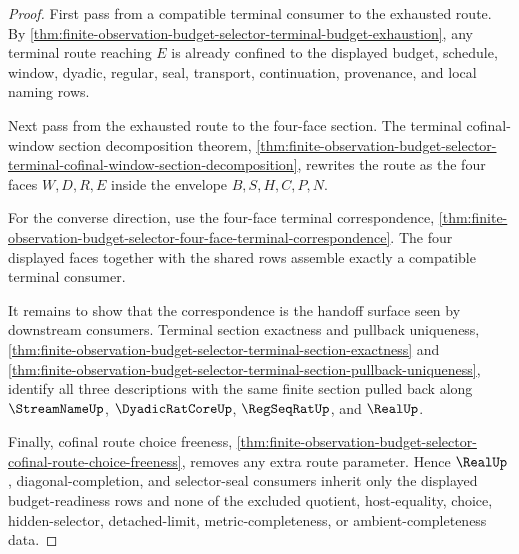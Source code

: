 \begin{proof}
First pass from a compatible terminal consumer to the exhausted route. By \autoref{thm:finite-observation-budget-selector-terminal-budget-exhaustion}, any terminal route reaching $E$ is already confined to the displayed budget, schedule, window, dyadic, regular, seal, transport, continuation, provenance, and local naming rows.

Next pass from the exhausted route to the four-face section. The terminal cofinal-window section decomposition theorem, \autoref{thm:finite-observation-budget-selector-terminal-cofinal-window-section-decomposition}, rewrites the route as the four faces $W,D,R,E$ inside the envelope $B,S,H,C,P,N$.

For the converse direction, use the four-face terminal correspondence, \autoref{thm:finite-observation-budget-selector-four-face-terminal-correspondence}. The four displayed faces together with the shared rows assemble exactly a compatible terminal consumer.

It remains to show that the correspondence is the handoff surface seen by downstream consumers. Terminal section exactness and pullback uniqueness, \autoref{thm:finite-observation-budget-selector-terminal-section-exactness} and \autoref{thm:finite-observation-budget-selector-terminal-section-pullback-uniqueness}, identify all three descriptions with the same finite section pulled back along $\StreamNameUp$, $\DyadicRatCoreUp$, $\RegSeqRatUp$, and $\RealUp$.

Finally, cofinal route choice freeness, \autoref{thm:finite-observation-budget-selector-cofinal-route-choice-freeness}, removes any extra route parameter. Hence $\RealUp$, diagonal-completion, and selector-seal consumers inherit only the displayed budget-readiness rows and none of the excluded quotient, host-equality, choice, hidden-selector, detached-limit, metric-completeness, or ambient-completeness data.
\end{proof}

